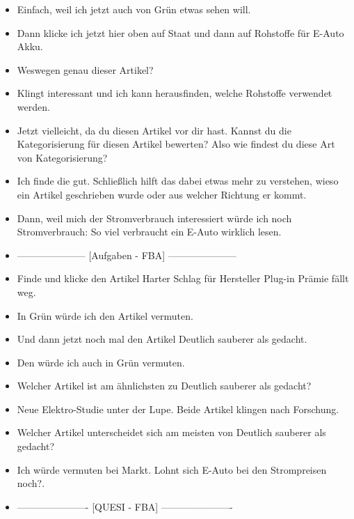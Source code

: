 {\begin{itemize}[]
        \item {} Einfach, weil ich jetzt auch von Grün etwas sehen will.
        \item {} Dann klicke ich jetzt hier oben auf Staat und dann auf \flqq Rohstoffe für E-Auto Akku\frqq{}.
        \item {} Weswegen genau dieser Artikel?
        \item {} Klingt interessant und ich kann herausfinden, welche Rohstoffe verwendet werden.
        \item {} Jetzt vielleicht, da du diesen Artikel vor dir hast.
              Kannst du die Kategorisierung für diesen Artikel bewerten?
              Also wie findest du diese Art von Kategorisierung?
        \item {} Ich finde die gut.
              Schließlich hilft das dabei etwas mehr zu verstehen, wieso ein Artikel geschrieben wurde oder aus welcher Richtung er kommt.
        \item {} Dann, weil mich der Stromverbrauch interessiert würde ich noch \flqq Stromverbrauch: So viel verbraucht ein E-Auto wirklich\frqq{} lesen.
        \item {---------------------} [Aufgaben - FBA] {---------------------}
        \item {} Finde und klicke den Artikel \flqq Harter Schlag für Hersteller Plug-in Prämie fällt weg\frqq{}.
        \item {} In Grün würde ich den Artikel vermuten.
        \item {} Und dann jetzt noch mal den Artikel \flqq Deutlich sauberer als gedacht\frqq{}.
        \item {} Den würde ich auch in Grün vermuten.
        \item {} Welcher Artikel ist am ähnlichsten zu \flqq Deutlich sauberer als gedacht\frqq{}?
        \item {} \flqq Neue Elektro-Studie unter der Lupe\frqq{}. Beide Artikel klingen nach Forschung.
        \item {} Welcher Artikel unterscheidet sich am meisten von \flqq Deutlich sauberer als gedacht\frqq{}?
        \item {} Ich würde vermuten bei Markt. \flqq Lohnt sich E-Auto bei den Strompreisen noch?\frqq{}.
        \item {----------------------} [QUESI - FBA] {----------------------}

\end{itemize}}
